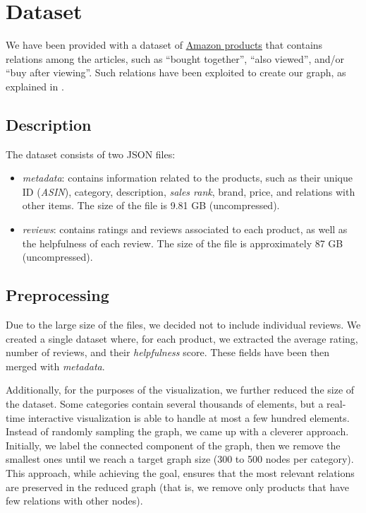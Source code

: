 \documentclass[a4paper,12pt]{article}
\begin{document}
\newpage

\section{Dataset}
\label{sec:dataset}
We have been provided with a dataset of \href{http://jmcauley.ucsd.edu/data/amazon/}{Amazon products} that contains relations among the articles, such as ``bought together'', ``also viewed'', and/or ``buy after viewing''. Such relations have been exploited to create our graph, as explained in .

\subsection{Description}
The dataset consists of two JSON files:
\begin{itemize}
	\item \textit{metadata}: contains information related to the products, such as their unique ID (\textit{ASIN}), category, description, \textit{sales rank}, brand, price, and  relations with other items. The size of the file is 9.81 GB (uncompressed).
	\item \textit{reviews}: contains ratings and reviews associated to each product, as well as the helpfulness of each review. The size of the file is approximately 87 GB (uncompressed).
\end{itemize}

\subsection{Preprocessing}
Due to the large size of the files, we decided not to include individual reviews. We created a single dataset where, for each product, we extracted the average rating, number of reviews, and their \textit{helpfulness} score. These fields have been then merged with \textit{metadata}.

Additionally, for the purposes of the visualization, we further reduced the size of the dataset. Some categories contain several thousands of elements, but a real-time interactive visualization is able to handle at most a few hundred elements. Instead of randomly sampling the graph, we came up with a cleverer approach. Initially, we label the connected component of the graph, then we remove the smallest ones until we reach a target graph size (300 to 500 nodes per category). This approach, while achieving the goal, ensures that the most relevant relations are preserved in the reduced graph (that is, we remove only products that have few relations with other nodes).
\end{document}
